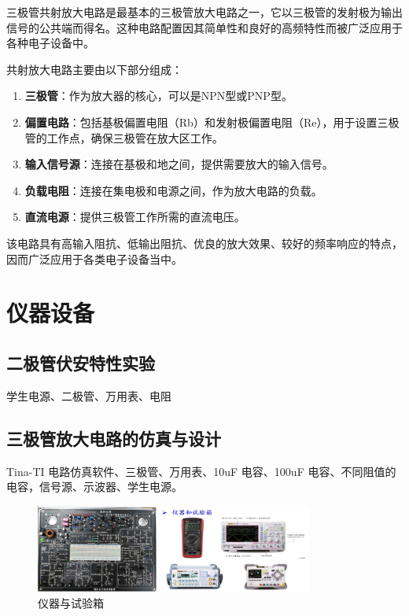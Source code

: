 \documentclass[]{article}
\begin{document}
三极管共射放大电路是最基本的三极管放大电路之一，它以三极管的发射极为输出信号的公共端而得名。这种电路配置因其简单性和良好的高频特性而被广泛应用于各种电子设备中。

共射放大电路主要由以下部分组成：

\begin{enumerate}
	\item \textbf{三极管}：作为放大器的核心，可以是NPN型或PNP型。
	\item \textbf{偏置电路}：包括基极偏置电阻（Rb）和发射极偏置电阻（Re），用于设置三极管的工作点，确保三极管在放大区工作。
	\item \textbf{输入信号源}：连接在基极和地之间，提供需要放大的输入信号。
	\item \textbf{负载电阻}：连接在集电极和电源之间，作为放大电路的负载。
	\item \textbf{直流电源}：提供三极管工作所需的直流电压。
\end{enumerate}

该电路具有高输入阻抗、低输出阻抗、优良的放大效果、较好的频率响应的特点，因而广泛应用于各类电子设备当中。


\section{仪器设备}

\subsection{二极管伏安特性实验}
学生电源、二极管、万用表、电阻

\subsection{三极管放大电路的仿真与设计}
Tina-TI 电路仿真软件、三极管、万用表、10uF 电容、100uF 电容、不同阻值的电容，信号源、示波器、学生电源。

\begin{figure}[h]
	\centering
	
	\begin{minipage}{0.4\linewidth}
		\centering
		\includegraphics[width=4cm]{img/3_1}
	\end{minipage}
	\begin{minipage}{0.4\linewidth}
		\centering
		\includegraphics[width=5cm]{img/3_2}
	\end{minipage}
	
	\caption{仪器与试验箱}
	
\end{figure}
\end{document}
